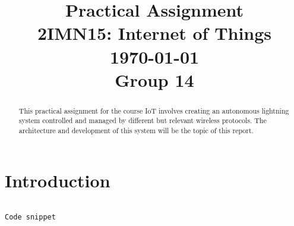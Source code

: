 \documentclass[conference]{IEEEtran}
\begin{document}
\title{Practical Assignment\\ {\fontsize{13}{0}\selectfont 2IMN15: Internet of Things } \\ {\fontsize{13}{0}\selectfont \today }\\{ \fontsize{13}{0}\selectfont Group 14}}

\author{
	\and
	}
\maketitle

\IEEEpeerreviewmaketitle


\begin{abstract}
	This practical assignment for the course IoT involves creating an autonomous lightning system controlled and managed by different but relevant wireless protocols. The architecture and development of this system will be the topic of this report.\\
	
\end{abstract}

\section{Introduction}





\begin{lstlisting}[basicstyle=\tiny,language=python,caption={Code}]

Code snippet
\end{lstlisting}
\end{document}

